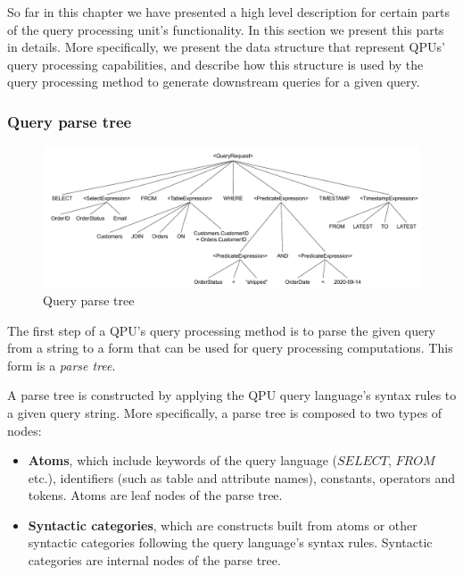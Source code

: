 So far in this chapter we have presented a high level description for certain parts of the query processing unit's
functionality.
In this section we present this parts in details.
More specifically, we present the data structure that represent QPUs' query processing capabilities,
and describe how this structure is used by the query processing method to generate downstream queries for a given query.

\subsubsection{Query parse tree}
\label{sec:query_parse_tree}

\begin{figure}[t]
  \centering
    \includegraphics[width=\textwidth]{./figures/design_pattern/parse_tree.pdf}
  \caption{Query parse tree}
  \label{fig:parse_tree}
\end{figure}

The first step of a QPU's query processing method is to parse the given query from a string to a form that can be used
for query processing computations.
This form is a \textit{parse tree}.

A parse tree is constructed by applying the QPU query language's syntax rules to a given query string.
More specifically, a parse tree is composed to two types of nodes:

\begin{itemize}
  \item \textbf{Atoms}, which include keywords of the query language ($SELECT$, $FROM$ etc.),
  identifiers (such as table and attribute names), constants, operators and tokens.
  Atoms are leaf nodes of the parse tree.

  \item \textbf{Syntactic categories}, which are constructs built from atoms or other syntactic categories
  following the query language's syntax rules.
  Syntactic categories are internal nodes of the parse tree.
\end{itemize}

